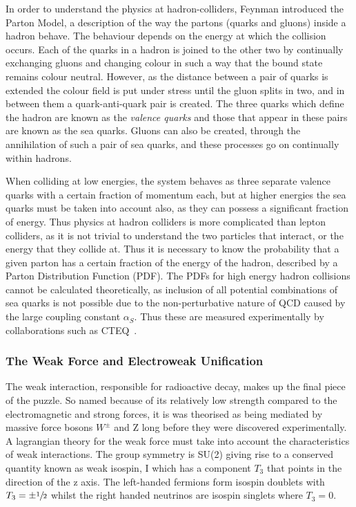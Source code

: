  In order to understand the physics at hadron-colliders, Feynman introduced the Parton Model, a description of the way the partons (quarks and gluons) inside a hadron behave. The behaviour depends on the energy at which the collision occurs. Each of the quarks in a hadron is joined to the other two by continually exchanging gluons and changing colour in such a way that the bound state remains colour neutral. However, as the distance between a pair of quarks is extended the colour field is put under stress until the gluon splits in two, and in between them a quark-anti-quark pair is created. The three quarks which define the hadron are known as the \textit{valence quarks} and those that appear in these pairs are known as the sea quarks. Gluons can also be created, through the annihilation of such a pair of sea quarks, and these processes go on continually within hadrons. 
 
 When colliding at low energies, the system behaves as three separate valence quarks with a certain fraction of momentum each, but at higher energies the sea quarks must be taken into account also, as they can possess a significant fraction of energy.  Thus physics at hadron colliders is more complicated than lepton colliders, as it is not trivial to understand the two particles that interact, or the energy that they collide at. Thus it is necessary to know the probability that a given parton has a certain fraction of the energy of the hadron,  described by a Parton Distribution Function (PDF). The PDFs for high energy hadron collisions cannot be calculated theoretically, as inclusion of all potential combinations of sea quarks is not possible due to the non-perturbative nature of QCD caused by the large coupling constant $\alpha_{S}$. Thus these are measured experimentally by collaborations such as CTEQ~\cite{CTEQ}. 
 


\subsubsection{The Weak Force and Electroweak Unification}

The weak interaction, responsible for radioactive decay, makes up the final piece of the puzzle. So named because of its relatively low strength compared to the electromagnetic and strong forces, it is was theorised as being mediated by massive force bosons $W^{\pm}$ and Z long before they were discovered experimentally. A lagrangian theory for the weak force must take into account the characteristics of weak interactions. The group symmetry is SU(2) giving rise to a conserved quantity known as weak isospin, I which has a component $T_{3}$ that points in the direction of the z axis. The left-handed fermions form isospin doublets with $T_{3} = \pm \sfrac{1}{2}$ whilst the right handed neutrinos are isospin singlets where $T_{3} = 0$.

